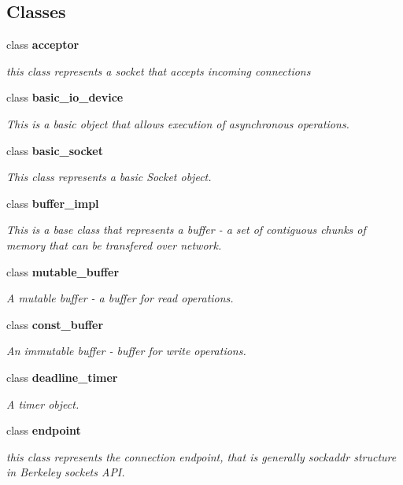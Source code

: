 \subsection*{Classes}
\begin{DoxyCompactItemize}
\item 
class {\bf acceptor}
\begin{DoxyCompactList}\small\item\em this class represents a socket that accepts incoming connections \end{DoxyCompactList}\item 
class {\bf basic\-\_\-io\-\_\-device}
\begin{DoxyCompactList}\small\item\em This is a basic object that allows execution of asynchronous operations. \end{DoxyCompactList}\item 
class {\bf basic\-\_\-socket}
\begin{DoxyCompactList}\small\item\em This class represents a basic Socket object. \end{DoxyCompactList}\item 
class {\bf buffer\-\_\-impl}
\begin{DoxyCompactList}\small\item\em This is a base class that represents a buffer -\/ a set of contiguous chunks of memory that can be transfered over network. \end{DoxyCompactList}\item 
class {\bf mutable\-\_\-buffer}
\begin{DoxyCompactList}\small\item\em A mutable buffer -\/ a buffer for read operations. \end{DoxyCompactList}\item 
class {\bf const\-\_\-buffer}
\begin{DoxyCompactList}\small\item\em An immutable buffer -\/ buffer for write operations. \end{DoxyCompactList}\item 
class {\bf deadline\-\_\-timer}
\begin{DoxyCompactList}\small\item\em A timer object. \end{DoxyCompactList}\item 
class {\bf endpoint}
\begin{DoxyCompactList}\small\item\em this class represents the connection endpoint, that is generally sockaddr structure in Berkeley sockets A\-P\-I. \end{DoxyCompactList}\item 

\end{DoxyCompactItemize}
